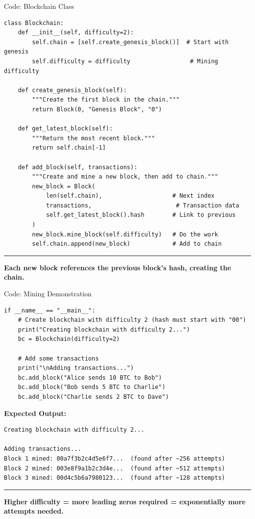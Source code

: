 \documentclass[8pt,aspectratio=169]{beamer}
\newcommand{\bottomnote}[1]{%
\vfill
\vspace{-2mm}
\textcolor{mllavender2}{\rule{\textwidth}{0.4pt}}
\vspace{1mm}
\footnotesize
\textbf{#1}
}
\begin{document}
\begin{frame}[fragile]{Code: Blockchain Class}
\begin{lstlisting}[style=python]
class Blockchain:
    def __init__(self, difficulty=2):
        self.chain = [self.create_genesis_block()]  # Start with genesis
        self.difficulty = difficulty                 # Mining difficulty

    def create_genesis_block(self):
        """Create the first block in the chain."""
        return Block(0, "Genesis Block", "0")

    def get_latest_block(self):
        """Return the most recent block."""
        return self.chain[-1]

    def add_block(self, transactions):
        """Create and mine a new block, then add to chain."""
        new_block = Block(
            len(self.chain),                    # Next index
            transactions,                        # Transaction data
            self.get_latest_block().hash        # Link to previous
        )
        new_block.mine_block(self.difficulty)   # Do the work
        self.chain.append(new_block)            # Add to chain
\end{lstlisting}

\bottomnote{Each new block references the previous block's hash, creating the chain.}
\end{frame}

\begin{frame}[fragile]{Code: Mining Demonstration}
\begin{lstlisting}[style=python]
if __name__ == "__main__":
    # Create blockchain with difficulty 2 (hash must start with "00")
    print("Creating blockchain with difficulty 2...")
    bc = Blockchain(difficulty=2)

    # Add some transactions
    print("\nAdding transactions...")
    bc.add_block("Alice sends 10 BTC to Bob")
    bc.add_block("Bob sends 5 BTC to Charlie")
    bc.add_block("Charlie sends 2 BTC to Dave")
\end{lstlisting}

\vspace{0.5em}
\textbf{Expected Output:}
\begin{lstlisting}[style=python,numbers=none]
Creating blockchain with difficulty 2...

Adding transactions...
Block 1 mined: 00a7f3b2c4d5e6f7...  (found after ~256 attempts)
Block 2 mined: 003e8f9a1b2c3d4e...  (found after ~512 attempts)
Block 3 mined: 00d4c5b6a7980123...  (found after ~128 attempts)
\end{lstlisting}

\bottomnote{Higher difficulty = more leading zeros required = exponentially more attempts needed.}
\end{frame}
\end{document}
